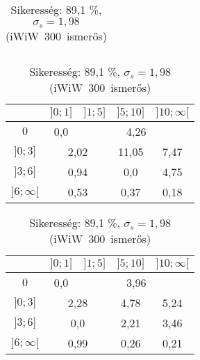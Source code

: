 \documentclass[12pt]{article}
\begin{document}
\begin{table}[H]
\begin{subtable}{0.49\linewidth}
\begin{tabular}{|c|c|c|c|c|}
		\end{tabular}
		\caption{Sikeresség: 75,0 \%, $\sigma_s = 1,73$ \mbox{(iWiW 100 ismerős)}}
		\label{iwiw100}
	\end{subtable}
	\newline
	\vspace*{0.3cm}
	\newline
	\begin{subtable}{0.49\textwidth}
		\centering
		\captionsetup{justification=centering}
		\begin{tabular}{|c|c|c|c|c|}
			\hline
			\diagbox[width=1.5cm,height=1.2cm]{$\sigma_{cs}$}{$n_{cs}$} & $]0;1]$ & $]1;5]$ & $]5;10]$ & $]10;\infty[$  \\
			\hline
			$0$ & 0,0 & \multicolumn{3}{|c|}{4,26} \\
			\hline
			$]0;3]$ & \multicolumn{2}{|c|}{2,02} & 11,05 & 7,47 \\
			\hline
			$]3;6]$ & \multicolumn{2}{|c|}{0,94} & 0,0 & 4,75 \\
			\hline
			$]6;\infty[$  & \multicolumn{2}{|c|}{0,53} & 0,37 & 0,18 \\
			\hline
		\end{tabular}
		\caption{Sikeresség: 86,7 \%, $\sigma_s = 2,05$ \mbox{(iWiW 200 ismerős)}}
		\label{iwiw200}
	\end{subtable}
	\begin{subtable}{0.49\textwidth}
		\centering
		\captionsetup{justification=centering}
		\begin{tabular}{|c|c|c|c|c|}
			\hline
			\diagbox[width=1.5cm,height=1.2cm]{$\sigma_{cs}$}{$n_{cs}$} & $]0;1]$ & $]1;5]$ & $]5;10]$ & $]10;\infty[$  \\
			\hline
			$0$ & 0,0 & \multicolumn{3}{|c|}{3,96} \\
			\hline
			$]0;3]$ & \multicolumn{2}{|c|}{2,28} & 4,78 & 5,24 \\
			\hline
			$]3;6]$ & \multicolumn{2}{|c|}{0,0} & 2,21 & 3,46 \\
			\hline
			$]6;\infty[$  & \multicolumn{2}{|c|}{0,99} & 0,26 & 0,21 \\
			\hline
		\end{tabular}
		\caption{Sikeresség: 89,1 \%, $\sigma_s = 1,98$ \mbox{(iWiW 300 ismerős)}}
		\label{iwiw300}
	\end{subtable}
\end{table}
\end{document}
